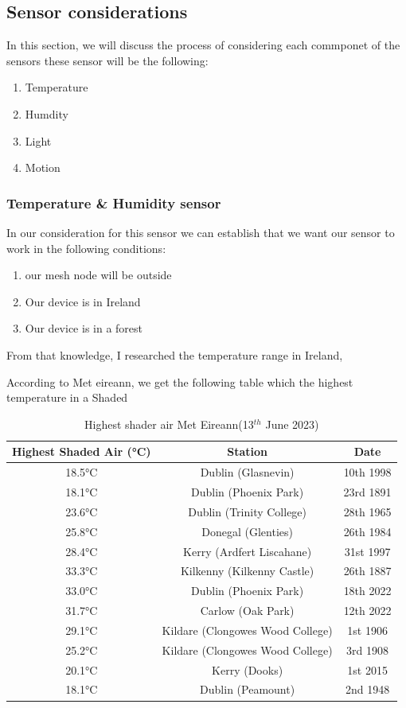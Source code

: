 \subsection{Sensor considerations}
In this section, we will discuss  the process of  considering each commponet of the sensors
these sensor will be the following:
\begin{enumerate}
	\item Temperature
	\item Humdity
	\item Light
	\item Motion
\end{enumerate}
\subsubsection{Temperature \& Humidity sensor}
In our consideration for  this  sensor we can establish that we want our sensor to work in the following  conditions:
\begin{enumerate}
	\item our mesh node will be outside
	\item Our device is in Ireland		\item Our device is in a forest
\end{enumerate}
From that knowledge, I researched the  temperature range in Ireland,


According to  Met eireann\cite{Eirrean}, we get the following table which  the highest temperature in a  Shaded
\begin{table}[h!]
	\begin{tabular}{ | c | c | c | }
		\hline
		Highest Shaded Air (°C) & Station & Date \\ \hline
		18.5°C & Dublin (Glasnevin) & 10th 1998 \\ \hline
		18.1°C & Dublin (Phoenix Park) & 23rd 1891 \\ \hline
		23.6°C & Dublin (Trinity College) & 28th 1965 \\ \hline
		25.8°C & Donegal (Glenties) & 26th 1984 \\ \hline
		28.4°C & Kerry (Ardfert Liscahane) & 31st 1997 \\ \hline
		33.3°C & Kilkenny (Kilkenny Castle) & 26th 1887 \\ \hline
		33.0°C & Dublin (Phoenix Park) & 18th 2022 \\ \hline
		31.7°C & Carlow (Oak Park) & 12th 2022 \\ \hline
		29.1°C & Kildare (Clongowes Wood College) & 1st 1906 \\ \hline
		25.2°C & Kildare (Clongowes Wood College) & 3rd 1908 \\ \hline
		20.1°C & Kerry (Dooks) & 1st 2015 \\ \hline
		18.1°C & Dublin (Peamount) & 2nd 1948 \\ \hline
		\end{tabular}
		\caption{Highest shader air Met Eireann(13$^{th}$ June 2023)}
		\label{Highest shader air Met eirrean}
	\end{table}

